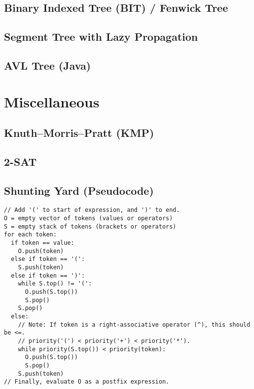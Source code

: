 \documentclass[9pt]{extarticle}
\begin{document}
\begin{multicols}{3}
\subsection{Binary Indexed Tree (BIT) / Fenwick Tree}


\subsection{Segment Tree with Lazy Propagation}


\subsection{AVL Tree (Java)}


\section{Miscellaneous}

\subsection{Knuth--Morris--Pratt (KMP)}


\subsection{2-SAT}


\subsection{Shunting Yard (Pseudocode)}
\begin{lstlisting}
// Add '(' to start of expression, and ')' to end.
O = empty vector of tokens (values or operators)
S = empty stack of tokens (brackets or operators)
for each token:
  if token == value:
    O.push(token)
  else if token == '(':
    S.push(token)
  else if token == ')':
    while S.top() != '(':
      O.push(S.top())
      S.pop()
    S.pop()
  else:
    // Note: If token is a right-associative operator (^), this should be <=.
	// priority('(') < priority('+') < priority('*').
    while priority(S.top()) < priority(token):
      O.push(S.top())
      S.pop()
    S.push(token)
// Finally, evaluate O as a postfix expression.
\end{lstlisting}


\end{multicols}
\end{document}
